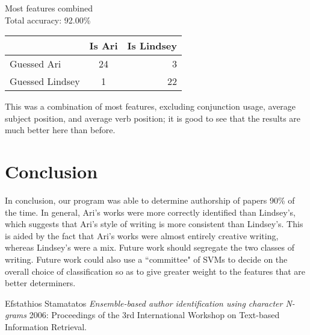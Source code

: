 \documentclass[twocolumn]{article}
\begin{document}
  \begin{center}
    Most features combined \\
    Total accuracy: 92.00\%
    \begin{tabular}{ l || c | r }
      \hline
      & Is Ari & Is Lindsey \\ \hline
      Guessed Ari & 24 & 3 \\ \hline
      Guessed Lindsey & 1 & 22 \\
      \hline
    \end{tabular}
  \end{center}
  
  This was a combination of most features, excluding conjunction usage, average subject position, and average verb position; it is good to see that the results are much better here than before.

  \section{Conclusion}
  In conclusion, our program was able to determine authorship of papers 90\% of the time. In general, Ari's works were more correctly identified than Lindsey's, which suggests that Ari's style of writing is more consistent than Lindsey's. This is aided by the fact that Ari's works were almost entirely creative writing, whereas Lindsey's were a mix. Future work should segregate the two classes of writing. Future work could also use a ``committee" of SVMs to decide on the overall choice of classification so as to give greater weight to the features that are better determiners.

\begin{thebibliography}{1}
   Efstathios Stamatatos {\em Ensemble-based author identification using character N-grams} 2006: Proceedings of the 3rd International Workshop on Text-based Information Retrieval.
\end{thebibliography}
\end{document}
